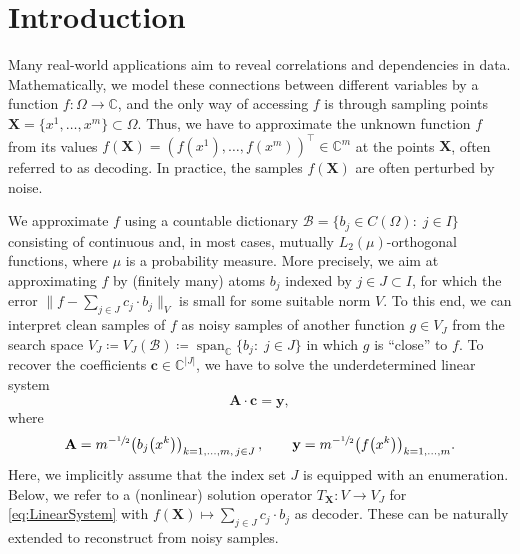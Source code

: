 \documentclass[11pt,reqno, a4paper]{article}
\numberwithin{equation}{section}
\DeclareMathOperator{\spann}{span}
\begin{document}
\section{Introduction} %

Many real-world applications aim to reveal correlations and dependencies in data.
Mathematically, we model these connections between different variables by a function $f\colon \Omega \to \mathbb{C}$, and the only way of accessing $f$ is through sampling points $\mathbf{X}=\{x^1,\ldots,x^m\}\subset\Omega$.
Thus, we have to approximate the unknown function $f$ from its values $f(\mathbf{X})=(f(x^1),\ldots, f(x^m))^{\top}\in\mathbb{C}^m$ at the points $\mathbf{X}$, often referred to as decoding.
In practice, the samples $f(\mathbf{X})$ are often perturbed by noise.

We approximate $f$ using a countable dictionary $\mathcal{B} = \{b_j\in C(\Omega)\colon \; j \in I\}$ consisting of continuous and, in most cases, mutually $L_2(\mu)$-orthogonal functions, where $\mu$ is a probability measure.
More precisely, we aim at approximating $f$ by (finitely many) atoms $b_j$ indexed by $j \in J \subset I$, for which the error $\lVert f - \sum_{j\in J} c_j\cdot b_j\rVert_{V}$ is small for some suitable norm $V$.
To this end, we can interpret clean samples of $f$ as noisy samples of another function $g\in V_J$ from the search space $V_J \coloneqq V_J(\mathcal{B}) \coloneqq \spann_{\mathbb{C}} \{b_j\colon \; j \in J\}$ in which $g$ is \enquote{close} to $f$.
To recover the coefficients $\mathbf{c} \in \mathbb{C}^{|J|}$, we have to solve the underdetermined linear system
\begin{equation}\label{eq:LinearSystem}
    \mathbf{A}\cdot\mathbf{c} = \mathbf{y},
\end{equation}
where
\begin{equation}
    \mathbf{A} = m^{-\sfrac{1}{2}} \bigl(b_j\bigl( x^k \bigr)\bigr)_{k=1, \ldots, m,\,  j\in J}\,, \qquad \mathbf{y} = m^{-\sfrac{1}{2}} \bigl(f\bigl( x^k \bigr)\bigr)_{k=1, \ldots, m}.
\end{equation}
Here, we implicitly assume that the index set $J$ is equipped with an enumeration.
Below, we refer to a (nonlinear) solution operator $T_{\mathbf{X}}\colon V\to V_J$ for \eqref{eq:LinearSystem} with $f(\mathbf X) \mapsto \sum_{j\in J} c_j\cdot b_j$ as decoder.
These can be naturally extended to reconstruct from noisy samples.
\end{document}
